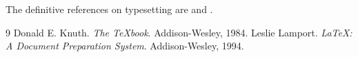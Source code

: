 \documentclass{article}
\begin{document}
The definitive references on typesetting are \cite{knuth1984} and
\cite{lamport1994}.

\begin{thebibliography}{9}
Donald E. Knuth. \textit{The \TeX{}book}. Addison-Wesley, 1984.
Leslie Lamport. \textit{\LaTeX: A Document Preparation System}.
Addison-Wesley, 1994.
\end{thebibliography}
\end{document}
